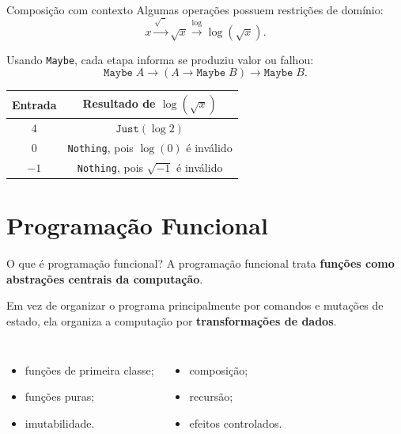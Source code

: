 \documentclass[aspectratio=169,11pt]{beamer}
\begin{document}
\begin{frame}{Composição com contexto}
  Algumas operações possuem restrições de domínio:
  \begin{equation*}
    x \xrightarrow{\sqrt{\phantom{x}}} \sqrt{x}
      \xrightarrow{\log} \log(\sqrt{x}).
  \end{equation*}

  Usando \texttt{Maybe}, cada etapa informa se produziu valor ou falhou:
  \begin{equation*}
    \texttt{Maybe}\;A
    \longrightarrow
    (A\rightarrow\texttt{Maybe}\;B)
    \longrightarrow
    \texttt{Maybe}\;B.
  \end{equation*}

  \begin{center}
    \begin{tabular}{c|c}
      \toprule
      Entrada & Resultado de $\log(\sqrt{x})$ \\
      \midrule
      $4$ & $\texttt{Just}(\log 2)$ \\
      $0$ & \texttt{Nothing}, pois $\log(0)$ é inválido \\
      $-1$ & \texttt{Nothing}, pois $\sqrt{-1}$ é inválido \\
      \bottomrule
    \end{tabular}
  \end{center}
\end{frame}

\section{Programação Funcional}

\begin{frame}{O que é programação funcional?}
  A programação funcional trata \textbf{funções como abstrações centrais da computação}.

  \vspace{0.25cm}
  Em vez de organizar o programa principalmente por comandos e mutações de estado,
  ela organiza a computação por \textbf{transformações de dados}.

  \vspace{0.3cm}
  \begin{columns}[T]
    \begin{itemize}
      \item funções de primeira classe;
      \item funções puras;
      \item imutabilidade.
    \end{itemize}

    \begin{itemize}
      \item composição;
      \item recursão;
      \item efeitos controlados.
    \end{itemize}
  \end{columns}
\end{frame}
\end{document}

